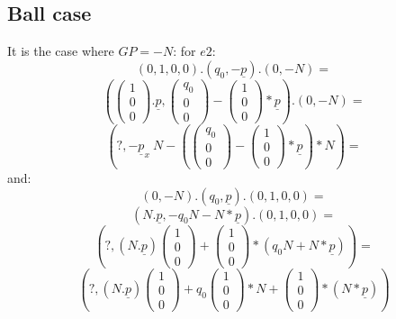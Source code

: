 \subsection{Ball case}
It is the case where $GP=-N$:
for $e2$:
\[(0,1,0,0).(q_0,-\underline p).(0,-N)=\]
\[\left(\left(\begin{array}{c}1\\0\\0\end{array}\right).\underline p,\left(\begin{array}{c}q_0\\0\\0\end{array}\right) -\left(\begin{array}{c}1\\0\\0\end{array}\right)*\underline p \right).(0,-N)=\]
\[\left(?, -\underline p_x~N-\left(\left(\begin{array}{c}q_0\\0\\0\end{array}\right)- \left(\begin{array}{c}1\\0\\0\end{array}\right)*\underline p \right)*N\right)=\]
and:
\[(0,-N).(q_0,\underline p).(0,1,0,0)=\]
\[(N.\underline p,-q_0N-N*\underline p).(0,1,0,0)=\]
\[\left(?,(N.\underline p)\left(\begin{array}{c}1\\0\\0\end{array}\right) + \left(\begin{array}{c}1\\0\\0\end{array}\right)*(q_0N+N*\underline p)\right)=\]
\[\left(?,(N.\underline p)\left(\begin{array}{c}1\\0\\0\end{array}\right)+q_0 \left(\begin{array}{c}1\\0\\0\end{array}\right)*N+\left(\begin{array}{c}1\\0\\0\end{array}\right)*(N*\underline p)\right)\]
